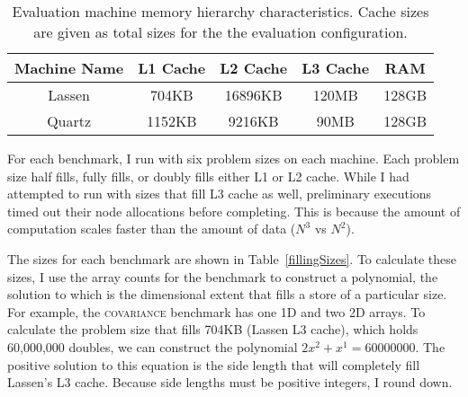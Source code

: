 \begin{table}[t]
	\centering
\begin{tabular}{|c|c|c|c|c|}
\hline
\textbf{Machine Name} & \textbf{L1 Cache} & \textbf{L2 Cache} & \textbf{L3 Cache} & \textbf{RAM} \\
\hline 
Lassen & 704KB & 16896KB & 120MB & 128GB \\ %
\hline
Quartz & 1152KB & 9216KB & 90MB & 128GB \\ 
\hline
\end{tabular}
\caption{Evaluation machine memory hierarchy characteristics. Cache sizes are given as total sizes for the the evaluation configuration.}\label{machineDetails}
\end{table}

For each benchmark, I run with six problem sizes on each machine. 
Each problem size half fills, fully fills, or doubly fills either L1 or L2 cache.
While I had attempted to run with sizes that fill L3 cache as well, preliminary executions timed out their node allocations before completing.
This is because the amount of computation scales faster than the amount of data ($N^3$ vs $N^2$).


The sizes for each benchmark are shown in Table~\ref{fillingSizes}.
To calculate these sizes, I use the array counts for the benchmark to construct a polynomial, the solution to which is the dimensional extent that fills a store of a particular size.
For example, the \textsc{covariance} benchmark has one 1D and two 2D arrays. 
To calculate the problem size that fills 704KB (Lassen L3 cache), which holds 60,000,000 doubles, we can construct the polynomial $2x^2 + x^1 = 60000000$.
The positive solution to this equation is the side length that will completely fill Lassen's L3 cache.
Because side lengths must be positive integers, I round down.

